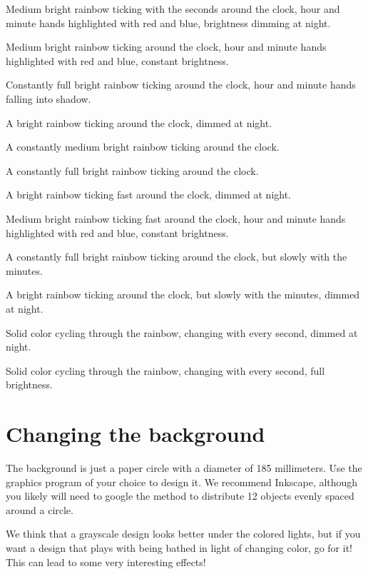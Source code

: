 \documentclass[a4paper,10pt,twocolumn]{article}
\begin{document}
\begin{description}%
\setlength\itemsep{0pt}%
\item[0/12] Medium bright rainbow ticking with the seconds around the clock, hour and minute hands highlighted with red 
	and blue, brightness dimming at night.
\item[1]    Medium bright rainbow ticking around the clock, hour and minute hands highlighted with red 
	and blue, constant brightness.
\item[2]    Constantly full bright rainbow ticking around the clock, hour and minute hands falling into
        shadow.
\item[3]    A bright rainbow ticking around the clock, dimmed at night.
\item[4]    A constantly medium bright rainbow ticking around the clock.
\item[5]    A constantly full bright rainbow ticking around the clock.
\item[6]    A bright rainbow ticking fast around the clock, dimmed at night.
\item[7]    Medium bright rainbow ticking fast around the clock, hour and minute hands highlighted with red 
	and blue, constant brightness.
\item[8]    A constantly full bright rainbow ticking around the clock, but slowly with the minutes.
\item[9]    A bright rainbow ticking around the clock, but slowly with the minutes, dimmed at night.
\item[10]   Solid color cycling through the rainbow, changing with every second, dimmed at night.
\item[11]   Solid color cycling through the rainbow, changing with every second, full brightness.
\end{description}


\section{Changing the background}

The background is just a paper circle with a diameter of 185 millimeters. Use the 
graphics program of your choice to design it. We recommend Inkscape, although you likely will
need to google the method to distribute 12 objects evenly spaced around a circle. 

We think that a grayscale design looks better under the colored lights, but if you
want a design that plays with being bathed in light of changing color, go for it!
This can lead to some very interesting effects!
\end{document}
